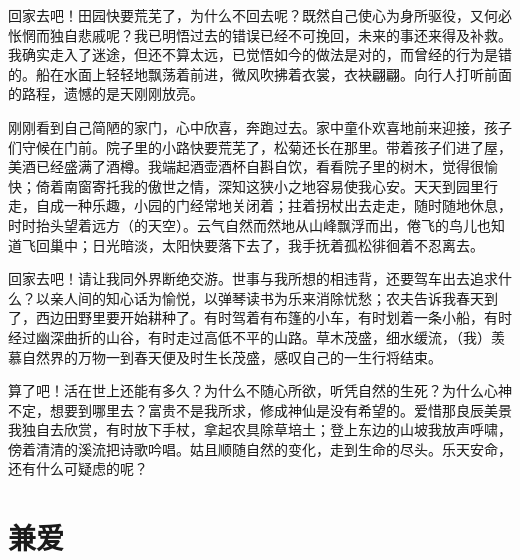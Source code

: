 \documentclass[12pt,UTF-8,openany,a4]{ctexbook}
\begin{document}
\begin{large}\yiwen
    
    回家去吧！田园快要荒芜了，为什么不回去呢？既然自己使心为身所驱役，又何必怅惘而独自悲戚呢？我已明悟过去的错误已经不可挽回，未来的事还来得及补救。我确实走入了迷途，但还不算太远，已觉悟如今的做法是对的，而曾经的行为是错的。船在水面上轻轻地飘荡着前进，微风吹拂着衣裳，衣袂翩翩。向行人打听前面的路程，遗憾的是天刚刚放亮。
    
    刚刚看到自己简陋的家门，心中欣喜，奔跑过去。家中童仆欢喜地前来迎接，孩子们守候在门前。院子里的小路快要荒芜了，松菊还长在那里。带着孩子们进了屋，美酒已经盛满了酒樽。我端起酒壶酒杯自斟自饮，看看院子里的树木，觉得很愉快；倚着南窗寄托我的傲世之情，深知这狭小之地容易使我心安。天天到园里行走，自成一种乐趣，小园的门经常地关闭着；拄着拐杖出去走走，随时随地休息，时时抬头望着远方（的天空）。云气自然而然地从山峰飘浮而出，倦飞的鸟儿也知道飞回巢中；日光暗淡，太阳快要落下去了，我手抚着孤松徘徊着不忍离去。
    
    回家去吧！请让我同外界断绝交游。世事与我所想的相违背，还要驾车出去追求什么？以亲人间的知心话为愉悦，以弹琴读书为乐来消除忧愁；农夫告诉我春天到了，西边田野里要开始耕种了。有时驾着有布篷的小车，有时划着一条小船，有时经过幽深曲折的山谷，有时走过高低不平的山路。草木茂盛，细水缓流，（我）羡慕自然界的万物一到春天便及时生长茂盛，感叹自己的一生行将结束。
    
    算了吧！活在世上还能有多久？为什么不随心所欲，听凭自然的生死？为什么心神不定，想要到哪里去？富贵不是我所求，修成神仙是没有希望的。爱惜那良辰美景我独自去欣赏，有时放下手杖，拿起农具除草培土；登上东边的山坡我放声呼啸，傍着清清的溪流把诗歌吟唱。姑且顺随自然的变化，走到生命的尽头。乐天安命，还有什么可疑虑的呢？
    

\end{large}



\chapter{兼爱}
\end{document}
